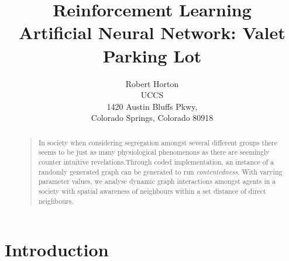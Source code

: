\documentclass[letterpaper]{article}
\begin{document}
%
\title{Reinforcement Learning\\ Artificial Neural Network: Valet Parking Lot }
\author{Robert Horton\\
UCCS\\
1420 Austin Bluffs Pkwy,\\
Colorado Springs, Colorado 80918\\
}
\maketitle

\begin{abstract}
\begin{quote}
In society when considering segregation amongst several different groups there seems to be just as many physiological phenomenons as there are seemingly counter intuitive revelations.Through coded implementation, an instance of a randomly generated  graph can be generated to run \textit{contentedness}.  With varying parameter values, we analyse dynamic graph interactions amongst agents in a society with spatial awareness of neighbours within a set distance of direct neighbours.   
\end{quote}
\end{abstract}

\section{Introduction}
\end{document}
